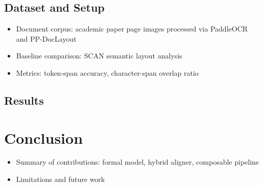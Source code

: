 \documentclass{article}
\theoremstyle{definition}
\begin{document}
\subsection{Dataset and Setup}
\begin{itemize}
  \item Document corpus: academic paper page images processed via PaddleOCR
        \cite{PaddleOCR30} and PP-DocLayout \cite{PPDocLayout}
  \item Baseline comparison: SCAN semantic layout analysis \cite{scan2025semantic}
  \item Metrics: token-span accuracy, character-span overlap ratio
\end{itemize}

\subsection{Results}

\section{Conclusion}
\begin{itemize}
  \item Summary of contributions: formal model, hybrid aligner, composable pipeline
  \item Limitations and future work
\end{itemize}



\end{document}
